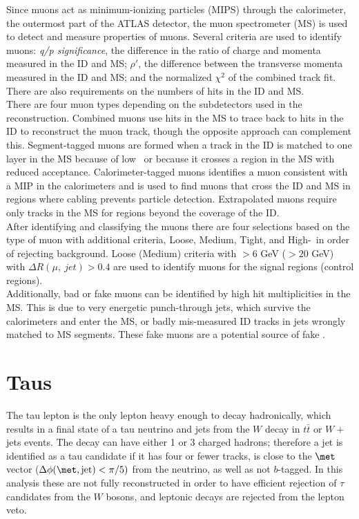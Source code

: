 Since muons act as minimum-ionizing particles (MIPS) through the calorimeter, the outermost part of the ATLAS detector, the muon spectrometer (MS) is used to detect and measure properties of muons.  Several criteria are used to identify muons\cite{PERF-2015-10}: \textit{q/p significance}, the difference in the ratio of charge and momenta measured in the ID and MS; $\rho'$, the difference between the transverse momenta measured in the ID and MS; and the normalized $\chi^2$ of the combined track fit.  There are also requirements on the numbers of hits in the ID and MS. \\

There are four muon types depending on the subdetectors used in the reconstruction.  Combined muons use hits in the MS to trace back to hits in the ID to reconstruct the muon track, though the opposite approach can complement this.  Segment-tagged muons are formed when a track in the ID is matched to one layer in the MS because of low \pt\ or because it crosses a region in the MS with reduced acceptance.  Calorimeter-tagged muons identifies a muon consistent with a MIP in the calorimeters and is used to find muons that cross the ID and MS in regions where cabling prevents particle detection.  Extrapolated muons require only tracks in the MS for regions beyond the coverage of the ID.  \\

After identifying and classifying the muons there are four selections based on the type of muon with additional criteria, Loose, Medium, Tight, and High-\pt\ in order of rejecting background.  Loose (Medium) criteria with \pt$>6$ GeV (\pt$>20$ GeV) with $\Delta R(\mu,\ jet) > 0.4$ are used to identify muons for the signal regions (control regions). \\

Additionally, bad or fake muons can be identified by high hit multiplicities in the MS.  This is due to very energetic punch-through jets, which survive the calorimeters and enter the MS, or badly mis-measured ID tracks in jets wrongly matched to MS segments.  These fake muons are a potential source of fake \met.

\section{Taus}

The tau lepton is the only lepton heavy enough to decay hadronically, which results in a final state of a tau neutrino and jets from the $W$ decay in $t\bar{t}$ or $W+$jets events.  The decay can have either 1 or 3 charged hadrons; therefore a jet is identified as a tau candidate if it has four or fewer tracks, is close to the $\met$ vector ($\Delta \phi (\met, \mathrm{jet}) < \pi/5)$ from the neutrino, as well as not $b$-tagged.  In this analysis these are not fully reconstructed in order to have efficient rejection of $\tau$ candidates from the $W$ bosons, and leptonic decays are rejected from the lepton veto. \\


